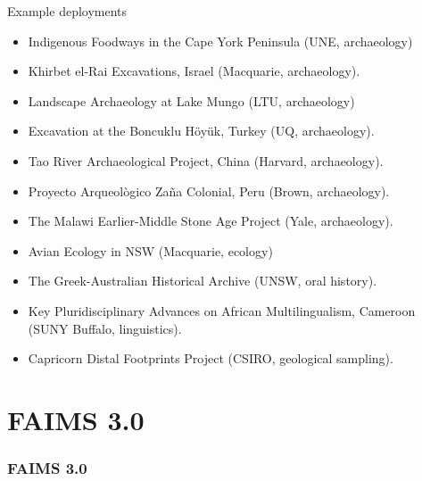 \documentclass[
	aspectratio=169, %
	12pt, %
	t, %
]{beamer}
\begin{document}
\begin{refsegment}
\begin{frame}{Example deployments}
 \begin{itemize}
        \item Indigenous Foodways in the Cape York Peninsula (UNE, archaeology)
        \item Khirbet el-Rai Excavations, Israel (Macquarie, archaeology).
        \item Landscape Archaeology at Lake Mungo (LTU, archaeology)
        \item Excavation at the Boncuklu Höyük, Turkey (UQ, archaeology).
        \item Tao River Archaeological Project, China (Harvard, archaeology).
        \item Proyecto Arqueològico Zaña Colonial, Peru (Brown, archaeology).
        \item The Malawi Earlier-Middle Stone Age Project (Yale, archaeology).
        \item Avian Ecology in NSW (Macquarie, ecology)
        \item The Greek-Australian Historical Archive (UNSW, oral history).
        \item Key Pluridisciplinary Advances on African Multilingualism, Cameroon (SUNY Buffalo, linguistics).
        \item Capricorn Distal Footprints Project (CSIRO, geological sampling).

    \end{itemize}
\end{frame}
\section{FAIMS 3.0}

\begin{sectionframe} %
	\frametitle{FAIMS 3.0}


\end{sectionframe}



\end{refsegment}
\end{document}
